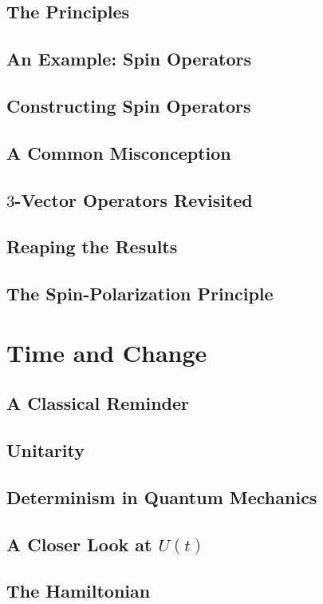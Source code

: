 \documentclass[a4paper]{article}
\begin{document}
\subsection{The Principles}
\subsection{An Example: Spin Operators}
\subsection{Constructing Spin Operators}

\subsection{A Common Misconception}
\subsection{$3$-Vector Operators Revisited}
\subsection{Reaping the Results}



\subsection{The Spin-Polarization Principle}
\section{Time and Change}
\subsection{A Classical Reminder}
\subsection{Unitarity}
\subsection{Determinism in Quantum Mechanics}
\subsection{A Closer Look at $U(t)$}

\subsection{The Hamiltonian}
\end{document}
